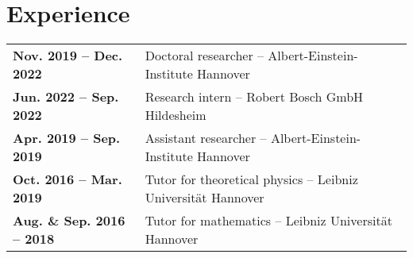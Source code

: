 {\vspace*{-0.5cm}
\section*{Experience}
\vspace*{-0.5cm}
\begin{tabularx}{\textwidth}{lX}
\textbf{Nov. 2019 -- Dec. 2022} & Doctoral researcher -- Albert-Einstein-Institute Hannover\\
\textbf{Jun. 2022 -- Sep. 2022} & Research intern -- Robert Bosch GmbH Hildesheim\\
\textbf{Apr. 2019 -- Sep. 2019} & Assistant researcher -- Albert-Einstein-Institute Hannover\\
\textbf{Oct. 2016 -- Mar. 2019} & Tutor for theoretical physics -- Leibniz Universität Hannover\\
\textbf{Aug. \& Sep. 2016 -- 2018} & Tutor for mathematics -- Leibniz Universität Hannover
\end{tabularx}
}
